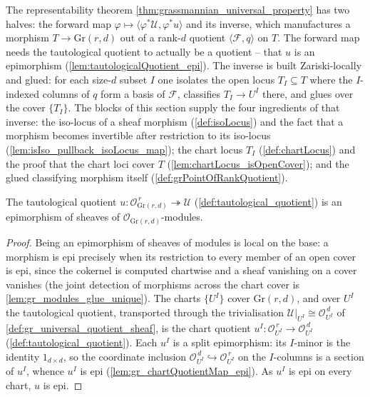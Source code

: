 The representability theorem \cref{thm:grassmannian_universal_property} has two halves:
the forward map \(\varphi \mapsto \langle \varphi^{*}\mathcal{U}, \varphi^{*}u\rangle\)
and its inverse, which manufactures a morphism \(T \to \mathrm{Gr}(r,d)\) out of a rank-\(d\)
quotient \(\langle \mathcal{F}, q\rangle\) on \(T\). The forward map needs the tautological
quotient to actually be a quotient -- that \(u\) is an epimorphism
(\cref{lem:tautologicalQuotient_epi}). The inverse is built Zariski-locally and glued: for
each size-\(d\) subset \(I\) one isolates the open locus \(T_I \subseteq T\) where the
\(I\)-indexed columns of \(q\) form a basis of \(\mathcal{F}\), classifies \(T_I \to U^I\)
there, and glues over the cover \(\{T_I\}\). The blocks of this section supply the four
ingredients of that inverse: the iso-locus of a sheaf morphism (\cref{def:isoLocus}) and
the fact that a morphism becomes invertible after restriction to its iso-locus
(\cref{lem:isIso_pullback_isoLocus_map}); the chart locus \(T_I\) (\cref{def:chartLocus})
and the proof that the chart loci cover \(T\) (\cref{lem:chartLocus_isOpenCover}); and the
glued classifying morphism itself (\cref{def:grPointOfRankQuotient}).

\begin{lemma}\leanok
  \label{lem:tautologicalQuotient_epi}
  The tautological quotient \(u : \mathcal{O}_{\mathrm{Gr}(r,d)}^{\,r}
  \twoheadrightarrow \mathcal{U}\) (\cref{def:tautological_quotient}) is an epimorphism of
  sheaves of \(\mathcal{O}_{\mathrm{Gr}(r,d)}\)-modules.
\end{lemma}
\begin{proof}
  Being an epimorphism of sheaves of modules is local on the base: a morphism is epi
  precisely when its restriction to every member of an open cover is epi, since the
  cokernel is computed chartwise and a sheaf vanishing on a cover vanishes
  (the joint detection of morphisms across the chart cover is
  \cref{lem:gr_modules_glue_unique}). The charts
  \(\{U^I\}\) cover \(\mathrm{Gr}(r,d)\), and over \(U^I\) the tautological quotient,
  transported through the trivialisation \(\mathcal{U}|_{U^I} \cong \mathcal{O}_{U^I}^{\,d}\)
  of \cref{def:gr_universal_quotient_sheaf}, is the chart quotient \(u^I :
  \mathcal{O}_{U^I}^{\,r} \to \mathcal{O}_{U^I}^{\,d}\) (\cref{def:tautological_quotient}).
  Each \(u^I\) is a split epimorphism: its \(I\)-minor is the identity \(1_{d\times d}\),
  so the coordinate inclusion \(\mathcal{O}_{U^I}^{\,d} \hookrightarrow
  \mathcal{O}_{U^I}^{\,r}\) on the \(I\)-columns is a section of \(u^I\), whence \(u^I\) is
  epi (\cref{lem:gr_chartQuotientMap_epi}). As \(u^I\) is epi on every chart, \(u\) is epi.
\end{proof}

